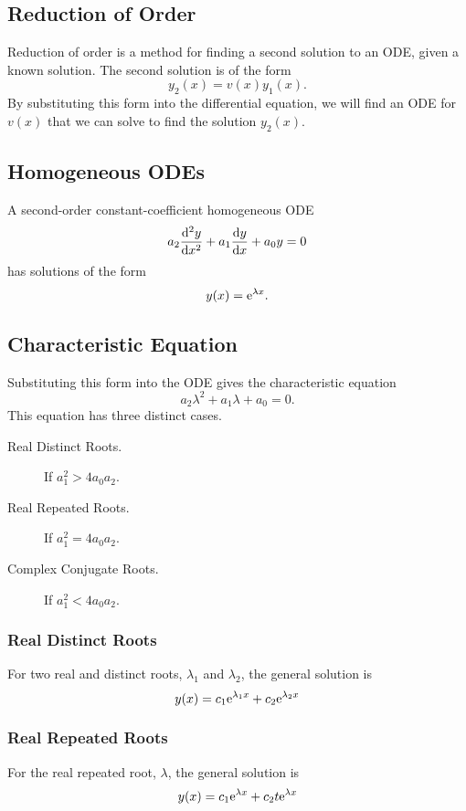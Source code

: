 \documentclass{article}
\begin{document}
\subsection{Reduction of Order}
Reduction of order is a method for finding a second solution
to an ODE, given a known solution.
The second solution is of the form
\begin{equation*}
    y_2(x) = v(x) y_1(x).
\end{equation*}
By substituting this form into the differential equation, we will find an ODE for
$v(x)$ that we can solve to find the solution $y_2(x)$.
\subsection{Homogeneous ODEs}
A second-order constant-coefficient homogeneous ODE
\begin{equation*}
    a_2\dv[2]{y}{x} + a_1\dv{y}{x} + a_0y = 0
\end{equation*}
has solutions of the form
\begin{equation*}
    y(x) = \mathrm{e}^{\lambda x}.
\end{equation*}
\subsection{Characteristic Equation}
Substituting this form into the ODE gives the characteristic equation
\begin{equation*}
    a_2\lambda^2 + a_1\lambda + a_0 = 0.
\end{equation*}
This equation has three distinct cases.
\begin{description}
    \item[Real Distinct Roots.] If $a_1^2 > 4a_0a_2$.
    \item[Real Repeated Roots.] If $a_1^2 = 4a_0a_2$.
    \item[Complex Conjugate Roots.] If $a_1^2 < 4a_0a_2$.
\end{description}
\subsubsection{Real Distinct Roots}
For two real and distinct roots, $\lambda_1$ and $\lambda_2$, the general solution is
\begin{equation*}
    y(x) = c_1\mathrm{e}^{\lambda_1 x} + c_2\mathrm{e}^{\lambda_2 x}
\end{equation*}
\subsubsection{Real Repeated Roots}
For the real repeated root, $\lambda$, the general solution is
\begin{equation*}
    y(x) = c_1\mathrm{e}^{\lambda x} + c_2 t\mathrm{e}^{\lambda x}
\end{equation*}
\end{document}
